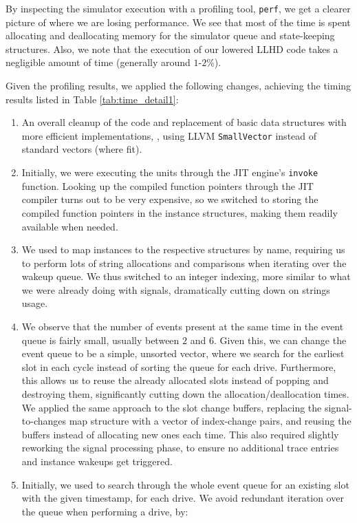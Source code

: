 By inspecting the simulator execution with a profiling tool, \texttt{perf}, we get a clearer picture of where we are losing performance. We see that most of the time is spent allocating and deallocating memory for the simulator queue and state-keeping structures. Also, we note that the execution of our lowered LLHD code takes a negligible amount of time (generally around $1$-$2\%$).

Given the profiling results, we applied the following changes, achieving the timing results listed in Table \ref{tab:time_detail1}:

\begin{enumerate}
  \item An overall cleanup of the code and replacement of basic data structures with more efficient implementations, \eg, using LLVM \texttt{SmallVector} instead of standard vectors (where fit).
  \item Initially, we were executing the units through the JIT engine's \texttt{invoke} function. Looking up the compiled function pointers through the JIT compiler turns out to be very expensive, so we switched to storing the compiled function pointers in the instance structures, making them readily available when needed.
  \item We used to map instances to the respective structures by name, requiring us to perform lots of string allocations and comparisons when iterating over the wakeup queue. We thus switched to an integer indexing, more similar to what we were already doing with signals, dramatically cutting down on strings usage.
  \item We observe that the number of events present at the same time in the event queue is fairly small, usually between $2$ and $6$. Given this, we can change the event queue to be a simple, unsorted vector, where we search for the earliest slot in each cycle instead of sorting the queue for each drive. Furthermore, this allows us to reuse the already allocated slots instead of popping and destroying them, significantly cutting down the allocation/deallocation times. We applied the same approach to the slot change buffers, replacing the signal-to-changes map structure with a vector of index-change pairs, and reusing the buffers instead of allocating new ones each time. This also required slightly reworking the signal processing phase, to ensure no additional trace entries and instance wakeups get triggered.
  \item Initially, we used to search through the whole event queue for an existing slot with the given timestamp, for each drive. We avoid redundant iteration over the queue when performing a drive, by:

\end{enumerate}
